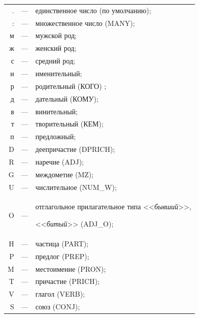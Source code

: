     \begin{tabular}{rcl}

    . &---& единственное число (по умолчанию);\\

    :&---& множественное число (MANY);\\

    м&---& мужской род;\\

    ж&---& женский род;\\

    с&---&средний род;\\

    и&---& именительный;\\

    р&---& родительный (КОГО) ;\\

    д&---& дательный (КОМУ);\\

    в&---& винительный;\\

    т&---& творительный (КЕМ);\\

    п&---& предложный;\\

    D&---& деепричастие (DPRICH);\\

    R &---& наречие (ADJ);\\

    G&---& междометие (MZ);\\

    U&---& числительное (NUM\_W);\\

    O&---& отглагольное прилагательное типа <<\textit{бывший}>>,

<<\textit{битый}>> (ADJ\_O);\\

    H&---& частица (PART);\\

    P&---& предлог (PREP);\\

    M&---& местоимение (PRON);\\

    T&---& причастие (PRICH);\\

    V&---& глагол (VERB);\\

    S&---& союз (CONJ);\\


\end{tabular}
